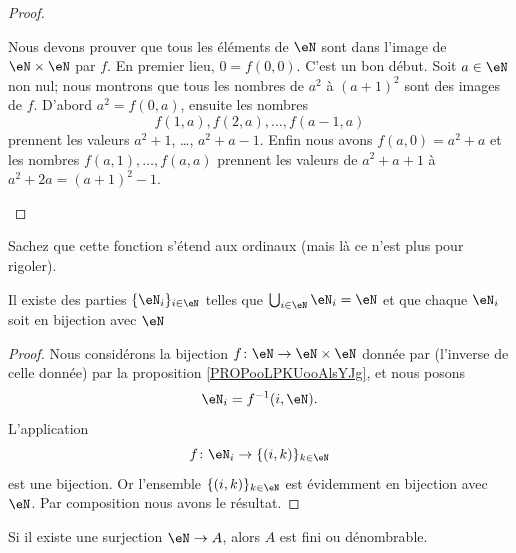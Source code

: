 \begin{proof}
\begin{subproof}

		Nous devons prouver que tous les éléments de \( \eN\) sont dans l'image de \( \eN\times \eN\) par \( f\). En premier lieu, \( 0=f(0,0)\). C'est un bon début. Soit \( a\in \eN\) non nul; nous montrons que tous les nombres de \( a^2\) à \( (a+1)^2\) sont des images de \( f\). D'abord \( a^2=f(0,a)\), ensuite les nombres
		\begin{equation}
			f(1,a),f(2,a),\ldots, f(a-1,a)
		\end{equation}
		prennent les valeurs \( a^2+1\), \ldots, \( a^2+a-1\). Enfin nous avons \( f(a,0)=a^2+a\) et les nombres \( f(a,1),\ldots, f(a,a)\) prennent les valeurs de \( a^2+a+1\) à \( a^2+2a=(a+1)^2-1\).
	\end{subproof}
\end{proof}

\begin{remark}	\label{REMooBijectionNNOrdinaux}
	Sachez que cette fonction s'étend aux ordinaux (mais là ce n'est plus pour rigoler).
\end{remark}

\begin{corollary}       \label{CORooNRPIooZPSmqa}
	Il existe des parties \( \{ \eN_i \}_{i\in \eN}\) telles que \( \bigcup_{i\in \eN}\eN_i=\eN\) et que chaque \( \eN_i\) soit en bijection avec \( \eN\)
\end{corollary}

\begin{proof}
	Nous considérons la bijection \( f\colon \eN\to \eN\times \eN\) donnée par (l'inverse de celle donnée) par la proposition \ref{PROPooLPKUooAlsYJg}, et nous posons
	\begin{equation}
		\eN_i=f^{-1}(i,\eN).
	\end{equation}
	L'application
	\begin{equation}
		f\colon \eN_i\to \{ (i,k) \}_{k\in \eN}
	\end{equation}
	est une bijection. Or l'ensemble \( \{ (i,k) \}_{k\in \eN}\) est évidemment en bijection avec \( \eN\). Par composition nous avons le résultat.
\end{proof}

\begin{lemma}        \label{LEMooDLWFooNAJbbq}
	Si il existe une surjection \( \eN\to A\), alors \( A\) est fini ou dénombrable.
\end{lemma}

